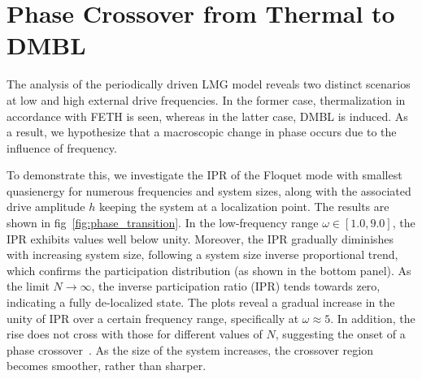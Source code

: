 \documentclass[%
reprint,
superscriptaddress,
linenumbers,
amsmath,amssymb,
aps,
prb,
showkeys,
]{revtex4-2}
\begin{document}
	\section{\label{sec:level5}Phase Crossover from Thermal to DMBL}
	The analysis of the periodically driven LMG model reveals two distinct scenarios at low and high external drive frequencies. In the former case, thermalization in accordance with FETH is seen, whereas in the latter case, DMBL is induced. As a result, we hypothesize that a macroscopic change in phase occurs due to the influence of frequency. 
	
	To demonstrate this, we investigate the IPR of the  Floquet mode with smallest quasienergy
	for numerous frequencies and system sizes, along with the associated drive amplitude $h$ keeping the system at a localization point. The results are shown in fig~\ref{fig:phase_transition}. In the low-frequency range $\omega \in \left[1.0, 9.0\right]$, the IPR exhibits values well below unity. Moreover, the IPR gradually diminishes with increasing system size, following a system size inverse proportional trend, which confirms the participation distribution (as shown in the bottom panel). As the limit  $N\rightarrow\infty$, the inverse participation ratio (IPR) tends towards zero, indicating a fully de-localized state. The plots reveal a gradual increase in the unity of IPR over a certain frequency range, specifically at $\omega \approx 5$. In addition, the rise does not cross with those for different values of $N$, suggesting the onset of a phase crossover~\cite{sierant_2023, sachdev_quantum_2011}. As the size of the system increases, the crossover region becomes smoother, rather than sharper.
\end{document}

